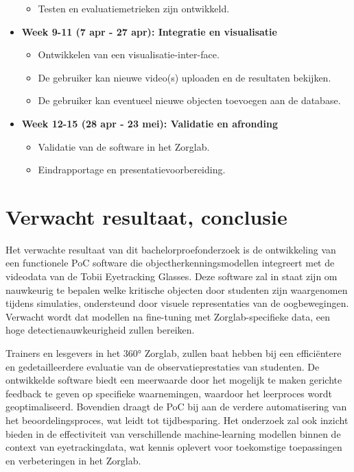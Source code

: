 \begin{itemize}
\begin{itemize}
          \item Testen en evaluatiemetrieken zijn ontwikkeld.
      \end{itemize}
  \item \textbf{Week 9-11 (7 apr - 27 apr): Integratie en visualisatie}
      \begin{itemize}
          \item Ontwikkelen van een visualisatie-inter-\newline face.
          \item De gebruiker kan nieuwe video(s) uploaden en de resultaten bekijken.
          \item De gebruiker kan eventueel nieuwe objecten toevoegen aan de database.
      \end{itemize}
  \item \textbf{Week 12-15 (28 apr - 23 mei): Validatie en afronding}
      \begin{itemize}
          \item Validatie van de software in het Zorglab.
          \item Eindrapportage en presentatievoorbereiding.
      \end{itemize}
\end{itemize}

\section{Verwacht resultaat, conclusie}%
\label{sec:verwachte_resultaten}

Het verwachte resultaat van dit bachelorproefonderzoek is de ontwikkeling van een functionele PoC 
software die objectherkenningsmodellen integreert met de videodata van de Tobii Eyetracking Glasses. 
Deze software zal in staat zijn om nauwkeurig te bepalen welke kritische objecten door studenten zijn waargenomen tijdens simulaties, 
ondersteund door visuele representaties van de oogbewegingen. Verwacht wordt dat modellen na fine-tuning met Zorglab-specifieke data, 
een hoge detectienauwkeurigheid zullen bereiken.
\par
Trainers en lesgevers in het 360° Zorglab, zullen baat hebben bij een efficiëntere en gedetailleerdere 
evaluatie van de observatieprestaties van studenten. De ontwikkelde software biedt een meerwaarde door het mogelijk 
te maken gerichte feedback te geven op specifieke waarnemingen, waardoor het leerproces wordt geoptimaliseerd. 
Bovendien draagt de PoC bij aan de verdere automatisering van het beoordelingsproces, wat leidt tot tijdbesparing. 
Het onderzoek zal ook inzicht bieden in de effectiviteit van verschillende 
machine-learning modellen binnen de context van eyetrackingdata, wat kennis oplevert voor toekomstige toepassingen en verbeteringen in het Zorglab.
